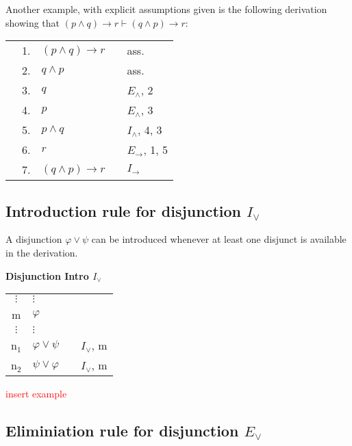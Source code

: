 \documentclass[nobib,nofonts]{tufte-handout}
\begin{document}
Another example, with explicit assumptions given is the following derivation showing that  $(p \wedge q) \rightarrow r \vdash (q \wedge p) \rightarrow r$:

\begin{tabular}{cclcl}
                     & 1. & $(p \wedge q) \rightarrow r$ & & ass. \\
  \cline{1-2} \vline & 2. & $q \wedge p$                 & & ass. \\
  \vline             & 3. & $q$                          & & $E_{\wedge}$, 2  \\
  \vline             & 4. & $p$                          & & $E_{\wedge}$, 3  \\
  \vline             & 5. & $p \wedge q$                 & & $I_{\wedge}$, 4, 3  \\
  \vline             & 6. & $r$                          & & $E_{\rightarrow}$, 1, 5  \\ \hline
                     & 7. & $(q \wedge p) \rightarrow r$ & & $I_{\rightarrow}$
\end{tabular}

\subsection{Introduction rule for disjunction $I_{\vee}$}

A disjunction $\varphi \vee \psi$ can be introduced whenever at least one disjunct is available in the derivation.

\bigskip
\noindent \colorbox{mygray!60}{\centering
  \begin{minipage}[t]{0.35\linewidth}
    \textbf{Disjunction Intro $I_{\vee}$}
  \end{minipage}
  \begin{minipage}[t]{0.55\linewidth}
    \begin{tabular}{clcl}
      $\vdots$ & $\vdots$                   & \\
      m & $\varphi$  &  \\
      $\vdots$ & $\vdots$                   & \\
      n$_{1}$ & $\varphi \vee \psi$ & & $I_{\vee}$, m \\
      n$_{2}$ & $\psi \vee \varphi$ & & $I_{\vee}$, m
    \end{tabular}
  \end{minipage}
}
\bigskip

\textcolor{red}{insert example}

\subsection{Eliminiation rule for disjunction $E_{\vee}$}
\end{document}
